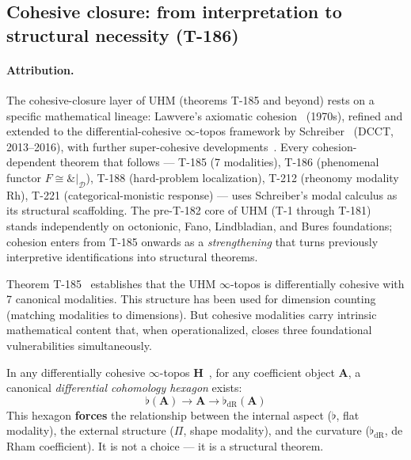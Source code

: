 \subsection{Cohesive closure: from interpretation to structural necessity (T-186)}
\label{subsec:cohesive-closure}

\paragraph{Attribution.} The cohesive-closure layer of UHM (theorems T-185 and beyond)
rests on a specific mathematical lineage: Lawvere's axiomatic cohesion~\cite{lawvere1973}
(1970s), refined and extended to the differential-cohesive $\infty$-topos framework by
Schreiber~\cite{schreiber2013} (DCCT, 2013--2016), with further super-cohesive
developments~\cite{sati-schreiber2018}. Every cohesion-dependent theorem that follows
--- T-185 (7 modalities), T-186 (phenomenal functor $F \cong \&|_{\mathcal D}$),
T-188 (hard-problem localization), T-212 (rheonomy modality $\mathrm{Rh}$), T-221
(categorical-monistic response) --- uses Schreiber's modal calculus as its
structural scaffolding. The pre-T-182 core of UHM (T-1 through T-181) stands
independently on octonionic, Fano, Lindbladian, and Bures foundations; cohesion
enters from T-185 onwards as a \emph{strengthening} that turns previously
interpretive identifications into structural theorems.

Theorem T-185~ establishes that the UHM $\infty$-topos is differentially cohesive
with 7 canonical modalities. This structure has been used for dimension counting (matching
modalities to dimensions). But cohesive modalities carry intrinsic mathematical content
that, when operationalized, closes three foundational vulnerabilities simultaneously.

In any differentially cohesive $\infty$-topos $\mathbf{H}$~\cite{schreiber2013}, for any
coefficient object $\mathbf{A}$, a canonical \emph{differential cohomology hexagon} exists:
\begin{equation}
  \flat(\mathbf{A}) \to \mathbf{A} \to \flat_{\mathrm{dR}}(\mathbf{A})
  \label{eq:hexagon}
\end{equation}
This hexagon \textbf{forces} the relationship between the internal aspect ($\flat$, flat
modality), the external structure ($\Pi$, shape modality), and the curvature
($\flat_{\mathrm{dR}}$, de Rham coefficient). It is not a choice --- it is a structural
theorem.

